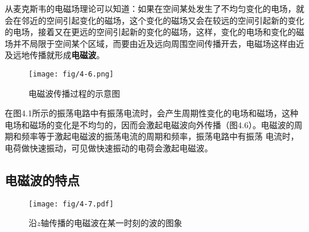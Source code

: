 从麦克斯韦的电磁场理论可以知道：如果在空间某处发生了不均匀变化的电场，就会在邻近的空间引起变化的磁场，这个变化的磁场又会在较远的空间引起新的变化的电场，接着又在更远的空间引起新的变化的磁场，这样，变化的电场和变化的磁场并不局限于空间某个区域，而要由近及远向周围空间传播开去，电磁场这样由近及远地传播就形成\textbf{电磁波}。
\begin{figure}[htp]\centering
\texttt{[image: fig/4-6.png]}
\caption{电磁波传播过程的示意图}
\end{figure}

在图4.1所示的振荡电路中有振荡电流时，会产生周期性变化的电场和磁场，这种电场和磁场的变化是不均匀的，因而会激起电磁波向外传播（图4.6）。电磁波的周期和频率等于激起电磁波的振荡电流的周期和频率，振荡电路中有振荡
电流时，电荷做快速振动，可见做快速振动的电荷会激起电磁波。

\subsection{电磁波的特点}
\begin{figure}[htp]\centering
\texttt{[image: fig/4-7.pdf]}
\caption{沿$z$轴传播的电磁波在某一时刻的波的图象}
\end{figure}

